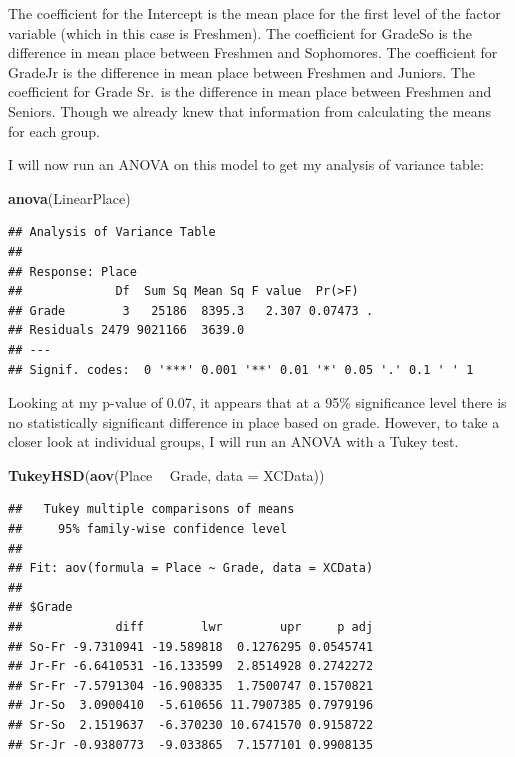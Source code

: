 \documentclass[
]{article}
\newenvironment{Shaded}{\begin{snugshade}}{\end{snugshade}}
\newcommand{\DataTypeTok}[1]{\textcolor[rgb]{0.13,0.29,0.53}{#1}}
\newcommand{\KeywordTok}[1]{\textcolor[rgb]{0.13,0.29,0.53}{\textbf{#1}}}
\newcommand{\NormalTok}[1]{#1}
\newcommand{\OperatorTok}[1]{\textcolor[rgb]{0.81,0.36,0.00}{\textbf{#1}}}
\newcommand{\StringTok}[1]{\textcolor[rgb]{0.31,0.60,0.02}{#1}}
\begin{document}
The coefficient for the Intercept is the mean place for the first level
of the factor variable (which in this case is Freshmen). The coefficient
for GradeSo is the difference in mean place between Freshmen and
Sophomores. The coefficient for GradeJr is the difference in mean place
between Freshmen and Juniors. The coefficient for Grade Sr.~is the
difference in mean place between Freshmen and Seniors. Though we already
knew that information from calculating the means for each group.

I will now run an ANOVA on this model to get my analysis of variance
table:

\begin{Shaded}
\begin{Highlighting}[]
\KeywordTok{anova}\NormalTok{(LinearPlace)}
\end{Highlighting}
\end{Shaded}

\begin{verbatim}
## Analysis of Variance Table
## 
## Response: Place
##             Df  Sum Sq Mean Sq F value  Pr(>F)  
## Grade        3   25186  8395.3   2.307 0.07473 .
## Residuals 2479 9021166  3639.0                  
## ---
## Signif. codes:  0 '***' 0.001 '**' 0.01 '*' 0.05 '.' 0.1 ' ' 1
\end{verbatim}

Looking at my p-value of 0.07, it appears that at a 95\% significance
level there is no statistically significant difference in place based on
grade. However, to take a closer look at individual groups, I will run
an ANOVA with a Tukey test.

\begin{Shaded}
\begin{Highlighting}[]
\KeywordTok{TukeyHSD}\NormalTok{(}\KeywordTok{aov}\NormalTok{(Place }\OperatorTok{~}\StringTok{ }\NormalTok{Grade, }\DataTypeTok{data =}\NormalTok{ XCData))}
\end{Highlighting}
\end{Shaded}

\begin{verbatim}
##   Tukey multiple comparisons of means
##     95% family-wise confidence level
## 
## Fit: aov(formula = Place ~ Grade, data = XCData)
## 
## $Grade
##             diff        lwr        upr     p adj
## So-Fr -9.7310941 -19.589818  0.1276295 0.0545741
## Jr-Fr -6.6410531 -16.133599  2.8514928 0.2742272
## Sr-Fr -7.5791304 -16.908335  1.7500747 0.1570821
## Jr-So  3.0900410  -5.610656 11.7907385 0.7979196
## Sr-So  2.1519637  -6.370230 10.6741570 0.9158722
## Sr-Jr -0.9380773  -9.033865  7.1577101 0.9908135
\end{verbatim}
\end{document}
